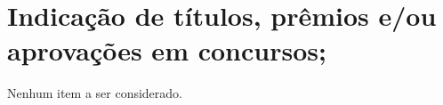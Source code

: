 \section[Indicação de títulos, prêmios e/ou aprovações em concursos]{Indicação de títulos, prêmios e/ou aprovações em concursos;}

Nenhum item a ser considerado.